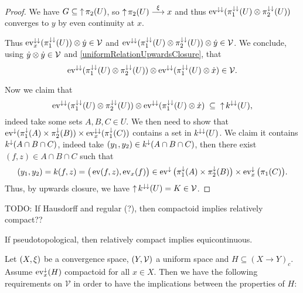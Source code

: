 \begin{proof}
We have $G \subseteq \operatorname{\uparrow}\pi_2(U)$, so $\operatorname{\uparrow}\pi_2(U) \overset{\xi}{\longrightarrow} x$ and thus $\operatorname{ev}^{\downarrow\downarrow}(\pi_1^{\downarrow\downarrow}(U)\otimes \pi_2^{\downarrow\downarrow}(U))$ converges to $y$ by even continuity at $x$.

Thus $\operatorname{ev}_x^{\downarrow\downarrow}(\pi_1^{\downarrow\downarrow}(U)) \otimes \dot{y}\in \mathcal{V}$ and $\operatorname{ev}^{\downarrow\downarrow}(\pi_1^{\downarrow\downarrow}(U)\otimes \pi_2^{\downarrow\downarrow}(U)) \otimes \dot{y}\in \mathcal{V}$. We conclude, using $\dot{y}\otimes \dot{y}\in \mathcal{V}$ and \ref{uniformRelationUpwardsClosure}, that
\[ \operatorname{ev}^{\downarrow\downarrow}(\pi_1^{\downarrow\downarrow}(U)\otimes \pi_2^{\downarrow\downarrow}(U)) \otimes \operatorname{ev}^{\downarrow\downarrow}(\pi_1^{\downarrow\downarrow}(U)\otimes \dot{x}) \in \mathcal{V}. \]

Now we claim that
\[ \operatorname{ev}^{\downarrow\downarrow}(\pi_1^{\downarrow\downarrow}(U)\otimes \pi_2^{\downarrow\downarrow}(U)) \otimes \operatorname{ev}^{\downarrow\downarrow}(\pi_1^{\downarrow\downarrow}(U)\otimes \dot{x}) \;\subseteq\; \operatorname{\uparrow} k^{\downarrow\downarrow}(U), \]
indeed take some sets $A,B,C\in U$. We then need to show that
$\operatorname{ev}^{\downarrow}(\pi_1^{\downarrow}(A)\times \pi_2^{\downarrow}(B)) \times \operatorname{ev}_x^{\downarrow\downarrow}(\pi_1^{\downarrow}(C))$ contains a set in $k^{\downarrow\downarrow}(U)$. We claim it contains $k^{\downarrow}(A\cap B\cap C)$, indeed take $(y_1,y_2)\in k^{\downarrow}(A\cap B\cap C)$, then there exist $(f, z)\in A\cap B\cap C$ such that
\[ (y_1, y_2) = k(f,z) = \big(\operatorname{ev}(f, z), \operatorname{ev}_x(f)\big) \in \operatorname{ev}^\downarrow\big(\pi_1^\downarrow(A)\times \pi_2^\downarrow(B)\big)\times \operatorname{ev}_x^\downarrow\big(\pi_1(C)\big). \]
Thus, by upwards closure, we have $\operatorname{\uparrow} k^{\downarrow\downarrow}(U) = K\in \mathcal{V}$.
\end{proof}

\begin{proposition}
TODO: If Hausdorff and regular (?), then compactoid implies relatively compact??
\end{proposition}

\begin{proposition}
If pseudotopological, then relatively compact implies equicontinuous.
\end{proposition}

Let $\sSet{X,\xi}$ be a convergence space, $\sSet{Y, \mathcal{V}}$ a uniform space and $H \subseteq (X\to Y)_c$. Assume $\operatorname{ev}_x^\downarrow(H)$ compactoid for all $x\in X$. Then we have the following requirements on $\mathcal{V}$ in order to have the implications between the properties of $H$:
\begin{center}  \end{center}

